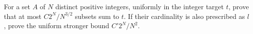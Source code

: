 For a set $A$ of $N$ distinct positive integers, uniformly in the integer target $t$, prove that at most $C2^N/N^{3/2}$ subsets sum to $t$. If their cardinality is also prescribed as $l$, prove the uniform stronger bound $C'2^N/N^2$.
